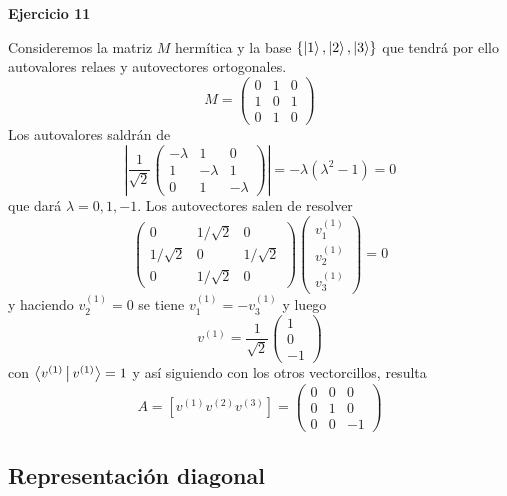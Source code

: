 \documentclass[10pt,oneside]{CBFT_book}
\begin{document}
\begin{ejemplo}{\bf Ejercicio 11}
 
Consideremos la matriz $M$ hermítica y la base $\{ \Ket{1}, \Ket{2}, \Ket{3} \}$ que tendrá por ello
autovalores relaes y autovectores ortogonales.
\[
	M = \begin{pmatrix}
	     0 & 1 & 0 \\
	     1 & 0 & 1 \\
	     0 & 1 & 0 
	    \end{pmatrix}
\]
Los autovalores saldrán de
\[
	\left| \frac{1}{\sqrt{2}} \begin{pmatrix}
	                         -\lambda & 1 & 0 \\  
	                         1 & -\lambda & 1 \\
	                         0 & 1 & -\lambda 
	                          \end{pmatrix}
				\right| = -\lambda(\lambda^2 -1) = 0
\]
que dará $\lambda = 0,1,-1$.
Los autovectores salen de resolver 
\[
	\begin{pmatrix}
	0 & 1/\sqrt{2} & 0 \\
	1/\sqrt{2} & 0 & 1/\sqrt{2} \\
	0 & 1/\sqrt{2} & 0 
	\end{pmatrix}
	\begin{pmatrix}
	v_1^{(1)} \\
	v_2^{(1)} \\
	v_3^{(1)}
	\end{pmatrix} = 0
\]
y haciendo $v_2^{(1)} =0$ se tiene $v_1^{(1)} =-v_3^{(1)} $ y luego
\[
	v^{(1)}  =\frac{1}{\sqrt{2}} \begin{pmatrix}
	                              1 \\
	                              0 \\
	                              -1
	                             \end{pmatrix}
\]
con $\Braket{v^{(1)}|v^{(1)}} =1$ y así siguiendo con los otros vectorcillos, resulta
\[
	A = \left[ v^{(1)} v^{(2)} v^{(3)} \right] = 
	\begin{pmatrix}
	    0 & 0 & 0 \\
	    0 & 1 & 0 \\
	    0 & 0 & -1 
	\end{pmatrix}
\]
 
\end{ejemplo}

\subsection{Representación diagonal}
\end{document}
